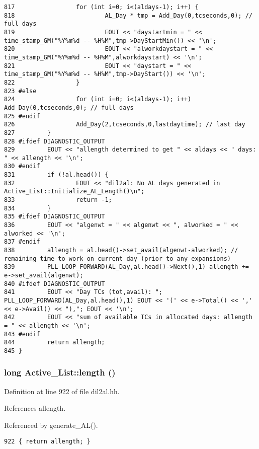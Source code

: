\begin{verbatim}
817                 for (int i=0; i<(aldays-1); i++) {
818                         AL_Day * tmp = Add_Day(0,tcseconds,0); // full days
819                         EOUT << "daystartmin = " << time_stamp_GM("%Y%m%d -- %H%M",tmp->DayStartMin()) << '\n';
820                         EOUT << "alworkdaystart = " << time_stamp_GM("%Y%m%d -- %H%M",alworkdaystart) << '\n';
821                         EOUT << "daystart = " << time_stamp_GM("%Y%m%d -- %H%M",tmp->DayStart()) << '\n';
822                 }
823 #else
824                 for (int i=0; i<(aldays-1); i++) Add_Day(0,tcseconds,0); // full days
825 #endif
826                 Add_Day(2,tcseconds,0,lastdaytime); // last day
827         }
828 #ifdef DIAGNOSTIC_OUTPUT
829         EOUT << "allength determined to get " << aldays << " days: " << allength << '\n';
830 #endif
831         if (!al.head()) {
832                 EOUT << "dil2al: No AL days generated in Active_List::Initialize_AL_Length()\n";
833                 return -1;
834         }
835 #ifdef DIAGNOSTIC_OUTPUT
836         EOUT << "algenwt = " << algenwt << ", alworked = " << alworked << '\n';
837 #endif
838         allength = al.head()->set_avail(algenwt-alworked); // remaining time to work on current day (prior to any expansions)
839         PLL_LOOP_FORWARD(AL_Day,al.head()->Next(),1) allength += e->set_avail(algenwt);
840 #ifdef DIAGNOSTIC_OUTPUT
841         EOUT << "Day TCs (tot,avail): "; PLL_LOOP_FORWARD(AL_Day,al.head(),1) EOUT << '(' << e->Total() << ',' << e->Avail() << "),"; EOUT << '\n';
842         EOUT << "sum of available TCs in allocated days: allength = " << allength << '\n';
843 #endif
844         return allength;
845 }
\end{verbatim}\normalsize 
{}
\subsubsection{\setlength{\rightskip}{0pt plus 5cm}long Active\_\-List::length ()\hspace{0.3cm}{\tt  [inline]}}\label{classActive__List_a3}




Definition at line 922 of file dil2al.hh.

References allength.

Referenced by generate\_\-AL().



\footnotesize\begin{verbatim}922 { return allength; }
\end{verbatim}\normalsize 
{}
